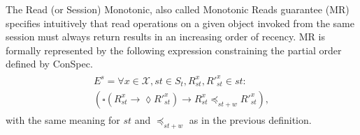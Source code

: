 \documentclass[journal,compsoc]{IEEEtran}
\begin{document}
The Read (or Session) Monotonic, also called Monotonic Reads guarantee (MR) specifies intuitively that read operations on a given object invoked from the same session must always return results in an increasing order of recency.   MR is formally represented by the following expression constraining the partial order defined by ConSpec.
\begin{align}\label{eqn:MR}
\begin{split}
    E^{s} =  \forall x \in \mathcal{X}, \mathit{st} \in \mathit{S_t}, R_\mathit{st}^x, R'^x_\mathit{st} \in \mathit{st}: \\
   \left( \square \left( R_\mathit{st}^x \rightarrow \lozenge R'^{x}_\mathit{st} \right) 
 \rightarrow R_\mathit{st}^x \preccurlyeq_{\mathit{st}+w} R'^{x}_\mathit{st} \right), 
\end{split}
\end{align} with the same meaning for $\mathit{st}$ and $\preccurlyeq_{\mathit{st}+w}$ as in the previous definition.
\end{document}
